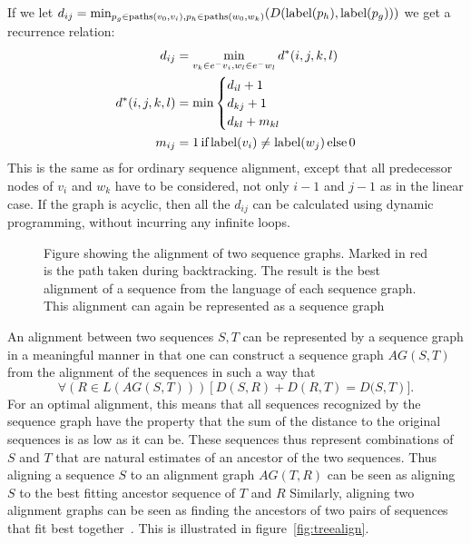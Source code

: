  If we let $d_{ij} = \min_{p_g \in \paths(v_0, v_i), p_h \in \paths(w_0, w_k)}(D(\slabel(p_h), \slabel(p_g)))$  we get a recurrence relation:
\begin{align*}
  d_{ij} &= \min_{v_k \in \preds{v_i}, w_l \in \preds{w_l}} d^*(i, j, k, l)\\
  d^*(i, j, k, l) &= \min \begin{cases}
    d_{il} + 1\\
    d_{kj} + 1\\
    d_{kl} + m_{kl}\\
    \end{cases}    
    \\
    m_{ij} &= 1\, \text{if}\, \slabel(v_i) \neq \slabel(w_j)\, \text{else}\, 0\\
\end{align*}
This is the same as for ordinary sequence alignment, except that all predecessor nodes of $v_i$ and $w_k$ have to be considered, not only $i-1$ and $j-1$ as in the linear case. If the graph is acyclic, then all the $d_{ij}$ can be calculated using dynamic programming, without incurring any infinite loops.
\begin{figure}
  \begin{tikzpicture}
    
  \end{tikzpicture}
  \label{fig:seqgrapha}
  \caption{Figure showing the alignment of two sequence graphs. Marked in red is the path taken during backtracking. The result is the best alignment of a sequence from the language of each sequence graph. This alignment can again be represented as a sequence graph}
\end{figure}

An alignment between two sequences $S, T$ can be represented by a sequence graph in a meaningful manner in that one can construct a sequence graph $AG(S, T)$ from the alignment of the sequences in such a way that 
\[
\forall (R \in L(AG(S, T)))\left[D(S, R)+D(R, T) =  D(S, T\right)].
\]
For an optimal alignment, this means that all sequences recognized by the sequence graph have the property that the sum of the distance to the original sequences is as low as it can be.
These sequences thus represent combinations of $S$ and $T$ that are natural estimates of an ancestor of the two sequences.
Thus aligning a sequence $S$ to an alignment graph $AG(T, R)$  can be seen as aligning $S$ to the best fitting ancestor sequence of $T$ and $R$
Similarly, aligning two alignment graphs can be seen as finding the ancestors of two pairs of sequences that fit best together~\cite{treealign}. This is illustrated in figure~\ref{fig:treealign}.

